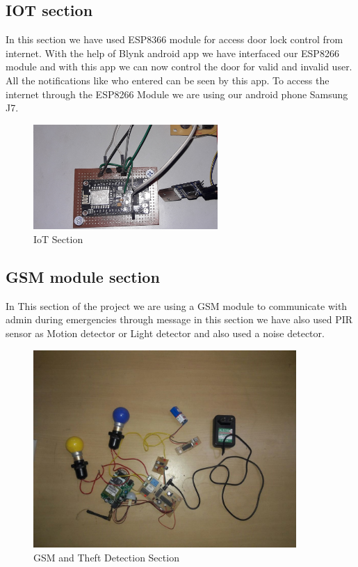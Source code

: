 \documentclass[twoside,a4paper,16pt]{book}
\begin{document}
{{\subsection{IOT section}
In this section we have used ESP8366 module for access door lock control from internet. With the help of Blynk android app we have interfaced our ESP8266 module and with this app we can now control the door for valid and invalid user. All the notifications like who entered can be seen by this app. To access the internet through the ESP8266 Module we are using our android phone Samsung J7.
\begin{figure}[ht!]
	\begin{center}
		\includegraphics[width=7.0cm]{count2.jpg}
		\caption{IoT Section }
	\end{center}
\end{figure}
\subsection{GSM module section}
In This section of the project we are using a GSM module to communicate with admin during emergencies through message in this section we have also used PIR sensor as Motion detector or Light detector and also used a noise detector.
\begin{figure}[ht!]
	\begin{center}
		\includegraphics[width=10.0cm]{f7.jpeg}
		\caption{GSM and Theft Detection Section }
	\end{center}
\end{figure}

}}
\end{document}
